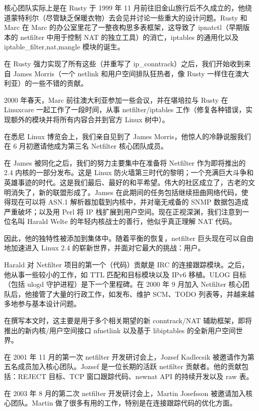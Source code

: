 \documentclass[12pt,UTF8]{ctexbook}
\begin{document}
核心团队实际上是在 Rusty 于 1999 年 11 月前往旧金山旅行后不久成立的，他绕道蒙特利尔（尽管缺乏保暖衣物）去会见并讨论一些重大的设计问题。Rusty 和 Marc 在 Marc 的办公室里花了一整夜构思多表框架，这导致了 ipnatctl（早期版本的 netfilter 中用于控制 NAT 的独立工具）的消亡，iptables 的通用化以及 iptable_{filter,nat,mangle} 模块的诞生。

在 Rusty 强力实现了所有这些（并重写了 ip\_conntrack）之后，我们开始收到来自 James Morris（一个 netlink 和用户空间排队狂热者，像 Rusty 一样住在澳大利亚）的一些不错的贡献。

2000 年春天，Marc 前往澳大利亚参加一些会议，并在堪培拉与 Rusty 在 Linuxcare 一起工作了一段时间，从事 netfilter/iptables 工作（修复各种错误，实现额外的模块并将所有内容合并到官方 Linux 树中）。

在悉尼 Linux 博览会上，我们亲自见到了 James Morris，他惊人的冷静说服我们在 6 月初邀请他成为第三名 Netfilter 核心团队成员。

在 James 被同化之后，我们的努力主要集中在准备将 Netfilter 作为即将推出的 2.4 内核的一部分发布。这是 Linux 防火墙第三时代的黎明；一个充满巨大斗争和英雄事迹的时代。这是我们最后、最好的和平希望。伟大的社区成立了，古老的文明消失了，新的联盟形成了。James 在此期间的任务包括继续扭曲网络代码，使得现在可以将 ASN.1 解析器加载到内核中，并对毫无戒备的 SNMP 数据包造成严重破坏；以及用 Perl 将 IP 栈扩展到用户空间。现在正视深渊，我们注意到一位名叫 Harald Welte 的年轻内核战士的善行，他似乎真正理解 NAT 代码。

因此，他的独特性被添加到集体中。随着平衡的恢复，netfilter 巨头现在可以自由地加速进入 Linux 2.4 的崭新世界，并面对它最大的挑战：用户。

Harald 对 Netfilter 项目的第一个（代码）贡献是 IRC 的连接跟踪模块。之后，他从事一些较小的工作，如 TTL 匹配和目标模块以及 IPv6 移植。ULOG 目标（包括 ulogd 守护进程）是下一个里程碑。在 2000 年 9 月加入 Netfilter 核心团队后，他接管了大量的行政工作，如发布、维护 SCM、TODO 列表等，并越来越多地参与基本设计问题。

在撰写本文时，这主要是用于多个相关期望的新 conntrack/NAT 辅助框架，即将推出的新内核/用户空间接口 nfnetlink 以及基于 libiptables 的全新用户空间世界。

在 2001 年 11 月的第一次 netfilter 开发研讨会上，Jozsef Kadlecsik 被邀请作为第五名成员加入核心团队。Jozsef 是一位长期的活跃 netfilter 贡献者。他的贡献包括：REJECT 目标、TCP 窗口跟踪代码、newnat API 的持续开发以及 raw 表。

在 2003 年 8 月的第二次 netfilter 开发研讨会上，Martin Josefsson 被邀请加入核心团队。Martin 做了很多有用的工作，特别是在连接跟踪代码的优化方面。
\end{document}
